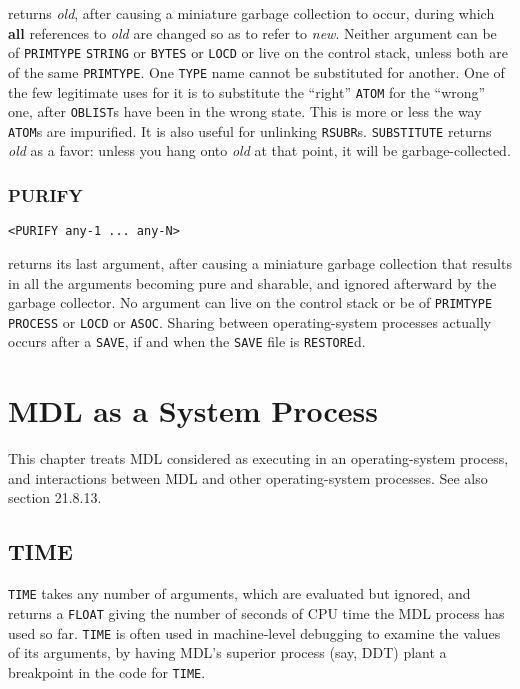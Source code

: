 \documentclass[a4paper]{scrbook}
\begin{document}
 returns \emph{old}, after causing a miniature garbage collection to occur, during which
\textbf{all} references to \emph{old} are changed so as to refer to \emph{new}. Neither argument can be of
\texttt{PRIMTYPE} \texttt{STRING} or \texttt{BYTES} or \texttt{LOCD} or live on the control stack, unless both are of the
same \texttt{PRIMTYPE}. One \texttt{TYPE} name cannot be substituted for another. One of the few legitimate uses for it is
to substitute the ``right'' \texttt{ATOM} for the ``wrong'' one, after \texttt{OBLIST}s have been in the wrong state. This
is more or less the way \texttt{ATOM}s are impurified. It is also useful for unlinking \texttt{RSUBR}s. \texttt{SUBSTITUTE}
returns \emph{old} as a favor: unless you hang onto \emph{old} at that point, it will be garbage-collected.

\subsection{PURIFY}\label{purify}

\begin{verbatim}
<PURIFY any-1 ... any-N>
\end{verbatim}

 returns its last argument, after causing a miniature garbage collection that results in all
the arguments becoming pure and sharable, and ignored afterward by the garbage collector. No argument can live on the
control stack or be of \texttt{PRIMTYPE} \texttt{PROCESS} or \texttt{LOCD} or \texttt{ASOC}. Sharing between
operating-system processes actually occurs after a \texttt{SAVE}, if and when the \texttt{SAVE} file
is \texttt{RESTORE}d.

\chapter{MDL as a System Process}\label{chapter-23.-mdl-as-a-system-process}

This chapter treats MDL considered as executing in an operating-system process, and interactions between MDL and other
operating-system processes. See also section 21.8.13.

\section{TIME}\label{time}

\texttt{TIME} takes any number of arguments, which are evaluated but ignored, and returns a
\texttt{FLOAT} giving the number of seconds of CPU time the MDL process has used so far. \texttt{TIME} is often used in
machine-level debugging to examine the values of its arguments, by having MDL's superior process (say, DDT) plant a
breakpoint in the code for \texttt{TIME}.
\end{document}
